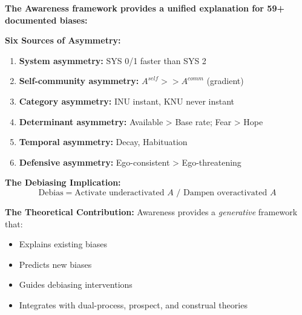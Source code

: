 \begin{tcolorbox}[colback=gray!5!white, colframe=gray!75!black, title=Key Insight: Biases as Awareness Asymmetries]

\textbf{The Awareness framework provides a unified explanation for 59+ documented biases:}

\textbf{Six Sources of Asymmetry:}
\begin{enumerate}
\item \textbf{System asymmetry:} SYS 0/1 faster than SYS 2
\item \textbf{Self-community asymmetry:} $A^{self} >> A^{comm}$ (gradient)
\item \textbf{Category asymmetry:} INU instant, KNU never instant
\item \textbf{Determinant asymmetry:} Available > Base rate; Fear > Hope
\item \textbf{Temporal asymmetry:} Decay, Habituation
\item \textbf{Defensive asymmetry:} Ego-consistent > Ego-threatening
\end{enumerate}

\textbf{The Debiasing Implication:}
$$\text{Debias} = \text{Activate underactivated } A \text{ / Dampen overactivated } A$$

\textbf{The Theoretical Contribution:}
Awareness provides a \emph{generative} framework that:
\begin{itemize}
\item Explains existing biases
\item Predicts new biases
\item Guides debiasing interventions
\item Integrates with dual-process, prospect, and construal theories
\end{itemize}

\end{tcolorbox}

